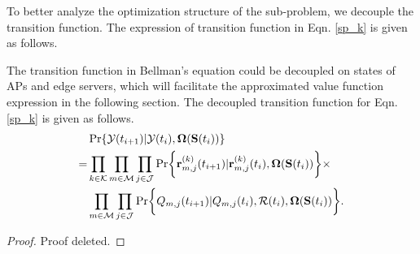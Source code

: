 To better analyze the optimization structure of the sub-problem, we decouple the transition function. The expression of transition function in Eqn. \ref{sp_k} is given as follows.
\begin{lemma}
    The transition function in Bellman's equation could be decoupled on states of APs and edge servers, which will facilitate the approximated value function expression in the following section.
    The decoupled transition function for Eqn. \ref{sp_k} is given as follows.
    \begin{align}
        & \Pr\{\Obsv(t_{i+1})|\Obsv(t_{i}), \Policy(\Stat(t_{i}))\}
        \nonumber\\
        =& \prod_{k\in\apSet}\prod_{m\in\esSet}\prod_{j\in\jSpace}
                \Pr\Brace{
                    \vec{r}^{(k)}_{m,j}(t_{i+1})|\vec{r}^{(k)}_{m,j}(t_{i}), \Policy(\Stat(t_{i}))
                }
                \times  
            \nonumber\\
            & \prod_{m\in\esSet}\prod_{j\in\jSpace}
                \Pr\Brace{
                    Q_{m,j}(t_{i+1})|Q_{m,j}(t_{i}), \mathcal{R}(t_{i}), \Policy(\Stat(t_{i}))
                }.
    \end{align}
\end{lemma}
\begin{proof}
    Proof deleted.
\end{proof}

